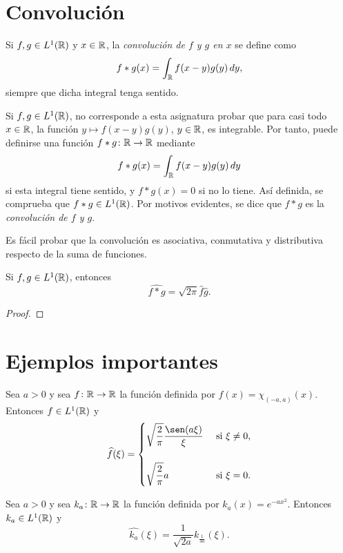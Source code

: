 \documentclass[a4paper, 12pt, extrafontsizes]{memoir}
\begin{document}
\section{Convolución}

\begin{definition}
    Si $f,g \in L^1(\mathbb R)$ y $x \in \mathbb R$, la \emph{convolución de $f$ y $g$ en $x$} se define como
    \[f \ast g(x) = \int_\mathbb R f(x-y)g(y) \, dy,\]
    siempre que dicha integral tenga sentido.
\end{definition}

Si $f,g \in L^1(\mathbb R)$, no corresponde a esta asignatura probar que para casi todo $x \in \mathbb R$, la función $y \mapsto f(x-y)g(y)$, $y \in \mathbb R$, es integrable. Por tanto, puede definirse una función $f \ast g \colon \mathbb R \to \mathbb R$ mediante
\[f \ast g(x) = \int_\mathbb R f(x-y)g(y) \, dy\]
si esta integral tiene sentido, y $f \ast g(x) = 0$ si no lo tiene. Así definida, se comprueba que $f\ast g \in L^1(\mathbb R)$. Por motivos evidentes, se dice que $f \ast g$ es la \emph{convolución de $f$ y $g$}.

Es fácil probar que la convolución es asociativa, conmutativa y distributiva respecto de la suma de funciones.

\begin{proposition}\label{pro:B.2.2}
    Si $f,g \in L^1(\mathbb R)$, entonces
    \[\widehat{f \ast g} = \sqrt{2\pi}\widehat{f}\widehat{g}.\]
\end{proposition}

\begin{proof}
    
\end{proof}

\section{Ejemplos importantes}

\begin{example}
    Sea $a > 0$ y sea $f \colon \mathbb R \to \mathbb R$ la función definida por $f(x)=\chi_{(-a,a)}(x)$. Entonces $f \in L^1(\mathbb R)$ y
    \[\widehat{f}(\xi) = \begin{cases}
        \displaystyle \sqrt{\frac{2}{\pi}}\frac{\sen(a\xi)}{\xi} & $ si $ \xi \neq 0, \\[20pt]
        \displaystyle \sqrt{\frac{2}{\pi}}a & $ si $ \xi = 0.
    \end{cases}\]
\end{example}

\begin{example}\label{eje:B.3.2}
    Sea $a > 0$ y sea $k_a \colon \mathbb R \to \mathbb R$ la función definida por $k_a(x) = e^{-ax^2}$. Entonces $k_a \in L^1(\mathbb R)$ y
    \[\widehat{k_a}(\xi) = \frac{1}{\sqrt{2a}}k_{\frac{1}{4a}}(\xi).\]
\end{example}
\end{document}
